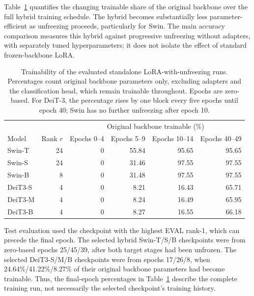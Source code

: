 \documentclass[runningheads,a4paper]{llncs}
\begin{document}
Table~\ref{tab:lora-trainability} quantifies the changing trainable share of the original backbone over the full hybrid training schedule. The hybrid becomes substantially less parameter-efficient as unfreezing proceeds, particularly for Swin. The main accuracy comparison measures this hybrid against progressive unfreezing without adapters, with separately tuned hyperparameters; it does not isolate the effect of standard frozen-backbone LoRA.

\begin{table}[!htbp]
    \centering
    \small
    \caption{Trainability of the evaluated standalone LoRA-with-unfreezing runs. Percentages count original backbone parameters only, excluding adapters and the classification head, which remain trainable throughout. Epochs are zero-based. For DeiT-3, the percentage rises by one block every five epochs until epoch 40; Swin has no further unfreezing after epoch 10.}
    \label{tab:lora-trainability}
    \begin{tabular}{lrrrrr}
        \toprule
        & & \multicolumn{4}{c}{Original backbone trainable (\%)} \\
        Model & Rank $r$ & Epochs 0--4 & Epochs 5--9 & Epochs 10--14 & Epochs 40--49 \\
        \midrule
        Swin-T  & 24 & 0 & 55.84 & 95.65 & 95.65 \\
        Swin-S  & 24 & 0 & 31.46 & 97.55 & 97.55 \\
        Swin-B  &  8 & 0 & 31.48 & 97.55 & 97.55 \\
        DeiT3-S &  4 & 0 &  8.21 & 16.43 & 65.71 \\
        DeiT3-M &  4 & 0 &  8.24 & 16.49 & 65.95 \\
        DeiT3-B &  4 & 0 &  8.27 & 16.55 & 66.18 \\
        \bottomrule
    \end{tabular}
\end{table}

Test evaluation used the checkpoint with the highest EVAL rank-1, which can precede the final epoch. The selected hybrid Swin-T/S/B checkpoints were from zero-based epochs 25/45/39, after both target stages had been unfrozen. The selected DeiT3-S/M/B checkpoints were from epochs 17/26/8, when 24.64\%/41.22\%/8.27\% of their original backbone parameters had become trainable. Thus, the final-epoch percentages in Table~\ref{tab:lora-trainability} describe the complete training run, not necessarily the selected checkpoint's training history.
\end{document}

